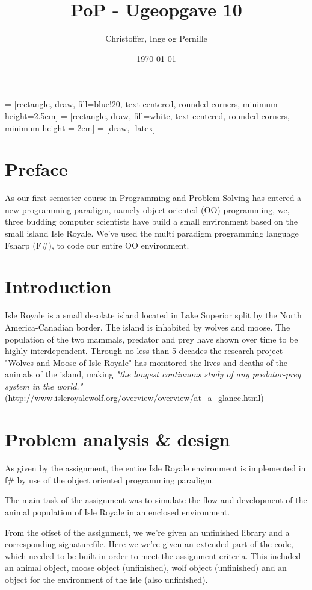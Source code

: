 \documentclass[a4paper]{report}
\title{PoP - Ugeopgave 10}
\author{Christoffer, Inge og Pernille}
\date{\today}
\begin{document}
\maketitle
{} = [rectangle, draw, fill=blue!20, text centered,
    rounded corners, minimum height=2.5em]
 = [rectangle, draw, fill=white, text centered,
    rounded corners, minimum height = 2em]
 = [draw, -latex]




\section*{Preface}
As our first semester course in Programming and Problem Solving has entered a new programming paradigm, namely object oriented (OO) programming, we, three budding computer scientists have build a small environment based on the small island Isle Royale. We've used the multi paradigm programming language Fsharp (F\#), to code our entire OO environment.

\section*{Introduction}
Isle Royale is a small desolate island located in Lake Superior split by the North America-Canadian border. The island is inhabited by wolves and moose. The population of the two mammals, predator and prey have shown over time to be highly interdependent.
Through no less than 5 decades the research project "Wolves and Moose of Isle Royale" has monitored the lives and deaths of the animals of the island, making \textit{"the longest continuous study of any predator-prey system in the world."} \url{(http://www.isleroyalewolf.org/overview/overview/at_a_glance.html)}



\section*{Problem analysis \& design}
As given by the assignment, the entire Isle Royale environment is implemented in f\# by use of the object oriented programming paradigm.

The main task of the assignment was to simulate the flow and development of the animal population of Isle Royale in an enclosed environment.

From the offset of the assignment, we we're given an unfinished library and a corresponding signaturefile.
Here we we're given an extended part of the code, which needed to be built in order to meet the assignment criteria.
This included an animal object, moose object (unfinished), wolf object (unfinished) and an object for the environment of the isle (also unfinished).
\end{document}

